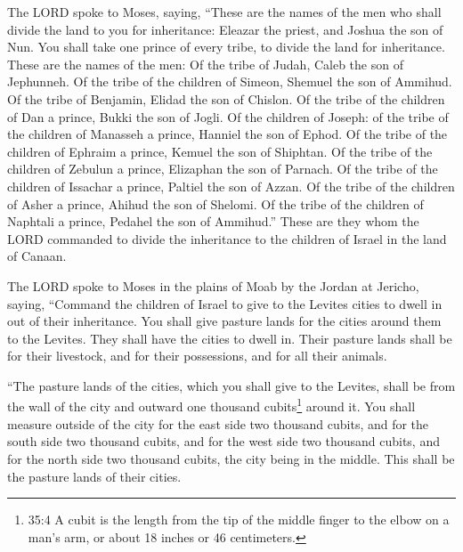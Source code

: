 \myverse{}The LORD spoke to Moses, saying,
\myverse{}“These are the names of the men who shall divide the land to you for inheritance:
Eleazar the priest, and Joshua the son of Nun.
\myverse{}You shall take one prince of every tribe, to divide the land for inheritance.
\myverse{}These are the names of the men: Of the tribe of Judah, Caleb the son of Jephunneh.
\myverse{}Of the tribe of the children of Simeon, Shemuel the son of Ammihud.
\myverse{}Of the tribe of Benjamin, Elidad the son of Chislon.
\myverse{}Of the tribe of the children of Dan a prince, Bukki the son of Jogli.
\myverse{}Of the children of Joseph: of the tribe of the children of Manasseh a prince,
Hanniel the son of Ephod.
\myverse{}Of the tribe of the children of Ephraim a prince, Kemuel the son of Shiphtan.
\myverse{}Of the tribe of the children of Zebulun a prince, Elizaphan the son of Parnach.
\myverse{}Of the tribe of the children of Issachar a prince, Paltiel the son of Azzan.
\myverse{}Of the tribe of the children of Asher a prince, Ahihud the son of Shelomi.
\myverse{}Of the tribe of the children of Naphtali a prince, Pedahel the son of Ammihud.”
\myverse{}These are they whom the LORD commanded to divide the inheritance to the children
of Israel in the land of Canaan.


\mychapter{} \myverse*{}The LORD spoke to Moses in the plains of Moab by the Jordan at
Jericho, saying,
\myverse{}“Command the children of Israel to give to the Levites cities to dwell in out
of their inheritance. You shall give pasture lands for the cities around them to the Levites.
\myverse{}They shall have the cities to dwell in. Their pasture lands shall be for their
livestock, and for their possessions, and for all their animals.


\myverse{}“The pasture lands of the cities, which you shall give to the
Levites, shall be from the wall of the city and outward one thousand cubits\footnote{ 35:4 A cubit is the length from the tip of the middle finger to the elbow on a man’s arm, or about
	18 inches or 46 centimeters.} around it.
\myverse{}You shall measure outside of the city for the east side two thousand cubits,
and for the south side two thousand cubits, and for the west side two thousand cubits, and for the north
side two thousand cubits, the city being in the middle. This shall be the pasture lands of their cities.


